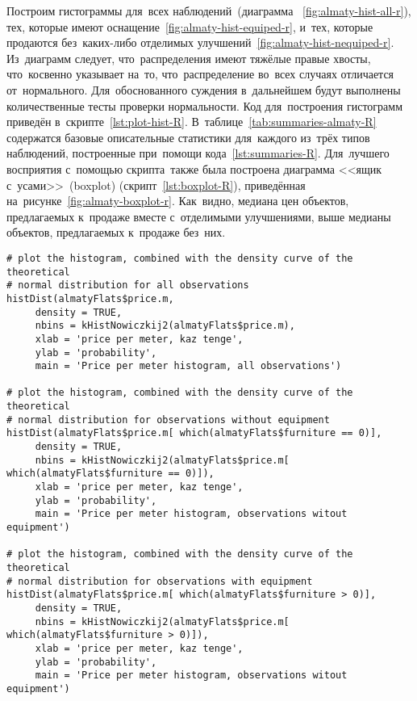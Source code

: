 \documentclass[]{scrreprt}
\begin{document}
Построим гистограммы для~всех наблюдений~(диаграмма ~\ref{fig:almaty-hist-all-r}), тех, которые имеют оснащение~\ref{fig:almaty-hist-equiped-r}, и~тех, которые продаются без~каких-либо отделимых улучшений~\ref{fig:almaty-hist-nequiped-r}. Из~диаграмм следует, что~распределения имеют тяжёлые правые хвосты, что~косвенно указывает на~то, что~распределение во~всех случаях отличается от~нормального. Для~обоснованного суждения в~дальнейшем будут выполнены количественные тесты проверки нормальности. Код для~построения гистограмм приведён в~скрипте~\ref{lst:plot-hist-R}. В~таблице~\ref{tab:summaries-almaty-R} содержатся базовые описательные статистики для~каждого из~трёх типов наблюдений, построенные при~помощи кода~\ref{lst:summaries-R}. Для~лучшего восприятия с~помощью скрипта~также была построена диаграмма <<ящик с~усами>>~(\foreignlanguage{english}{boxplot}) (скрипт~\ref{lst:boxplot-R}), приведённая на~рисунке~\ref{fig:almaty-boxplot-r}. Как~видно, медиана цен объектов, предлагаемых к~продаже вместе с~отделимыми улучшениями, выше медианы объектов, предлагаемых к~продаже без~них. 
%
\begin{lstlisting}[float, caption = Построение гистограмм для~наблюдений различных типов, firstnumber=1, label= lst:plot-hist-R]
# plot the histogram, combined with the density curve of the theoretical
# normal distribution for all observations
histDist(almatyFlats$price.m,
     density = TRUE,
     nbins = kHistNowiczkij2(almatyFlats$price.m),
     xlab = 'price per meter, kaz tenge',
     ylab = 'probability',
     main = 'Price per meter histogram, all observations')
     
# plot the histogram, combined with the density curve of the theoretical
# normal distribution for observations without equipment
histDist(almatyFlats$price.m[ which(almatyFlats$furniture == 0)],
     density = TRUE,
     nbins = kHistNowiczkij2(almatyFlats$price.m[ which(almatyFlats$furniture == 0)]),
     xlab = 'price per meter, kaz tenge',
     ylab = 'probability',
     main = 'Price per meter histogram, observations witout equipment')
     
# plot the histogram, combined with the density curve of the theoretical
# normal distribution for observations with equipment
histDist(almatyFlats$price.m[ which(almatyFlats$furniture > 0)],
     density = TRUE,
     nbins = kHistNowiczkij2(almatyFlats$price.m[ which(almatyFlats$furniture > 0)]),
     xlab = 'price per meter, kaz tenge',
     ylab = 'probability',
     main = 'Price per meter histogram, observations witout equipment')
\end{lstlisting}
\end{document}
